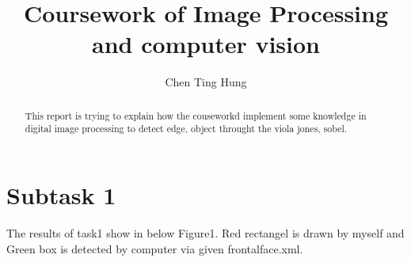 \documentclass[12pt]{article}
\begin{document}
\title{Coursework of Image Processing and computer vision}



\author{Chen Ting Hung}
	
\maketitle

\begin{abstract}
This report is trying to explain how the couseworkd implement some knowledge in digital image processing to detect edge, object throught the viola jones, sobel.
\end{abstract}

\section{Subtask 1}


The results of task1 show in below Figure1. Red rectangel is drawn by myself and Green box is detected by computer via given frontalface.xml.\\
\end{document}
